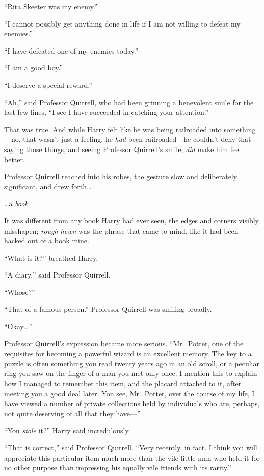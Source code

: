 ``Rita Skeeter was my enemy.''

``I cannot possibly get anything done in life if I am not willing to
defeat my enemies.''

``I have defeated one of my enemies today.''

``I am a good boy.''

``I deserve a special reward.''

``Ah,'' said Professor Quirrell, who had been grinning a benevolent
smile for the last few lines, ``I see I have succeeded in catching your
attention.''

That was true. And while Harry felt like he was being railroaded into
something---no, that wasn't just a feeling, he \emph{had} been
railroaded---he couldn't deny that saying those things, and seeing
Professor Quirrell's smile, \emph{did} make him feel better.

Professor Quirrell reached into his robes, the gesture slow and
deliberately significant, and drew forth\ldots{}

\ldots{}a \emph{book}.

It was different from any book Harry had ever seen, the edges and
corners visibly misshapen; \emph{rough-hewn} was the phrase that came to
mind, like it had been hacked out of a book mine.

``What is it?'' breathed Harry.

``A diary,'' said Professor Quirrell.

``Whose?''

``That of a famous person.'' Professor Quirrell was smiling broadly.

``Okay\ldots{}''

Professor Quirrell's expression became more serious. ``Mr.~Potter, one
of the requisites for becoming a powerful wizard is an excellent memory.
The key to a puzzle is often something you read twenty years ago in an
old scroll, or a peculiar ring you saw on the finger of a man you met
only once. I mention this to explain how I managed to remember this
item, and the placard attached to it, after meeting you a good deal
later. You see, Mr.~Potter, over the course of my life, I have viewed a
number of private collections held by individuals who are, perhaps, not
quite deserving of all that they have---''

``You \emph{stole} it?'' Harry said incredulously.

``That is correct,'' said Professor Quirrell. ``Very recently, in fact.
I think you will appreciate this particular item much more than the vile
little man who held it for no other purpose than impressing his equally
vile friends with its rarity.''

